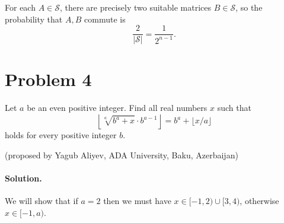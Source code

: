 \documentclass{article}
\begin{document}
For each $A \in \mathcal{S}$, there are precisely two suitable matrices $B \in \mathcal{S}$, so the probability that $A, B$ commute is
\[
\frac{2}{|\mathcal{S}|} = \frac{1}{2^{n-1}}.
\]

\section*{Problem 4}
Let $a$ be an even positive integer. Find all real numbers $x$ such that
\begin{equation}
\left\lfloor \sqrt[a]{b^a + x} \cdot b^{a-1} \right\rfloor = b^a + \lfloor x/a \rfloor
\end{equation}
holds for every positive integer $b$.

(proposed by Yagub Aliyev, ADA University, Baku, Azerbaijan)

\paragraph{Solution.}
We will show that if $a = 2$ then we must have $x \in [-1, 2) \cup [3, 4)$, otherwise $x \in [-1, a)$.
\end{document}
